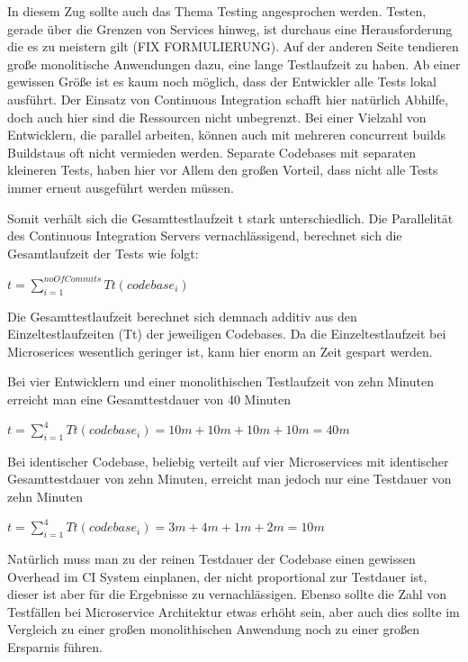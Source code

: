 In diesem Zug sollte auch das Thema Testing angesprochen werden. Testen, gerade über die Grenzen von Services hinweg, ist durchaus eine Herausforderung die es zu meistern gilt (FIX FORMULIERUNG). Auf der anderen Seite tendieren große monolitische Anwendungen dazu, eine lange Testlaufzeit zu haben. Ab einer gewissen Größe ist es kaum noch möglich, dass der Entwickler alle Tests lokal ausführt. Der Einsatz von Continuous Integration schafft hier natürlich Abhilfe, doch auch hier sind die Ressourcen nicht unbegrenzt. Bei einer Vielzahl von Entwicklern, die parallel arbeiten, können auch mit mehreren concurrent builds Buildstaus oft nicht vermieden werden. Separate Codebases mit separaten kleineren Tests, haben hier vor Allem den großen Vorteil, dass nicht alle Tests immer erneut ausgeführt werden müssen.

Somit verhält sich die Gesamttestlaufzeit t stark unterschiedlich. Die Parallelität des Continuous Integration Servers vernachlässigend, berechnet sich die Gesamtlaufzeit der Tests wie folgt:

$ t = \displaystyle\sum_{i=1}^{noOfCommits} Tt(codebase_i) $

Die Gesamttestlaufzeit berechnet sich demnach additiv aus den Einzeltestlaufzeiten (Tt) der jeweiligen Codebases. Da die Einzeltestlaufzeit bei Microserices wesentlich geringer ist, kann hier enorm an Zeit gespart werden.

Bei vier Entwicklern und einer monolithischen Testlaufzeit von zehn Minuten erreicht man eine Gesamttestdauer von 40 Minuten

$ t = \displaystyle\sum_{i=1}^{4} Tt(codebase_i) = 10m + 10m + 10m + 10m = 40m $

Bei identischer Codebase, beliebig verteilt auf vier Microservices mit identischer Gesamttestdauer von zehn Minuten, erreicht man jedoch nur eine Testdauer von zehn Minuten 

$ t = \displaystyle\sum_{i=1}^{4} Tt(codebase_i) = 3m + 4m + 1m + 2m = 10m $

Natürlich muss man zu der reinen Testdauer der Codebase einen gewissen Overhead im CI System einplanen, der nicht proportional zur Testdauer ist, dieser ist aber für die Ergebnisse zu vernachlässigen. Ebenso sollte die Zahl von Testfällen bei Microservice Architektur etwas erhöht sein, aber auch dies sollte im Vergleich zu einer großen monolithischen Anwendung noch zu einer großen Ersparnis führen.

